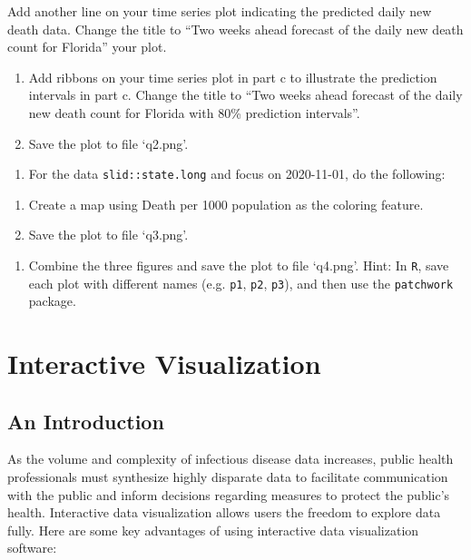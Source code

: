 \documentclass[]{book}
\providecommand{\tightlist}{%
  \setlength{\itemsep}{0pt}\setlength{\parskip}{0pt}}
\begin{document}
Add another line on your time series plot indicating the predicted daily
new death data. Change the title to ``Two weeks ahead forecast of the
daily new death count for Florida'' your plot.

\begin{enumerate}
\def\labelenumi{\alph{enumi}.}
\setcounter{enumi}{3}
\item
  Add ribbons on your time series plot in part c to illustrate the
  prediction intervals in part c. Change the title to ``Two weeks ahead
  forecast of the daily new death count for Florida with 80\% prediction
  intervals''.
\item
  Save the plot to file `q2.png'.
\end{enumerate}

\begin{enumerate}
\def\labelenumi{\arabic{enumi}.}
\setcounter{enumi}{2}
\tightlist
\item
  For the data \texttt{slid::state.long} and focus on 2020-11-01, do the
  following:
\end{enumerate}

\begin{enumerate}
\def\labelenumi{\alph{enumi}.}
\tightlist
\item
  Create a map using Death per 1000 population as the coloring feature.
\item
  Save the plot to file `q3.png'.
\end{enumerate}

\begin{enumerate}
\def\labelenumi{\arabic{enumi}.}
\setcounter{enumi}{3}
\tightlist
\item
  Combine the three figures and save the plot to file `q4.png'. Hint: In
  \texttt{R}, save each plot with different names (e.g. \texttt{p1},
  \texttt{p2}, \texttt{p3}), and then use the \texttt{patchwork}
  package.
\end{enumerate}

\chapter{Interactive Visualization}\label{plotly}

\section{An Introduction}\label{an-introduction}

As the volume and complexity of infectious disease data increases,
public health professionals must synthesize highly disparate data to
facilitate communication with the public and inform decisions regarding
measures to protect the public's health. Interactive data visualization
allows users the freedom to explore data fully. Here are some key
advantages of using interactive data visualization software:
\end{document}
